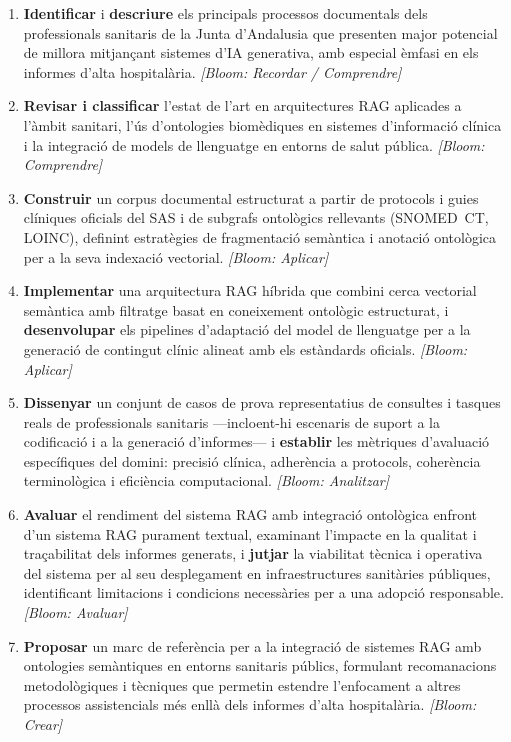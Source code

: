 \documentclass[11pt,a4paper]{article}
\begin{document}
\begin{enumerate}

    \item \textbf{Identificar} i \textbf{descriure} els principals processos documentals dels professionals sanitaris de la Junta d'Andalusia que presenten major potencial de millora mitjançant sistemes d'IA generativa, amb especial èmfasi en els informes d'alta hospitalària.
    \textit{[Bloom: Recordar / Comprendre]}

    \item \textbf{Revisar i classificar} l'estat de l'art en arquitectures RAG aplicades a l'àmbit sanitari, l'ús d'ontologies biomèdiques en sistemes d'informació clínica i la integració de models de llenguatge en entorns de salut pública.
    \textit{[Bloom: Comprendre]}

    \item \textbf{Construir} un corpus documental estructurat a partir de protocols i guies clíniques oficials del SAS i de subgrafs ontològics rellevants (SNOMED~CT, LOINC), definint estratègies de fragmentació semàntica i anotació ontològica per a la seva indexació vectorial.
    \textit{[Bloom: Aplicar]}

    \item \textbf{Implementar} una arquitectura RAG híbrida que combini cerca vectorial semàntica amb filtratge basat en coneixement ontològic estructurat, i \textbf{desenvolupar} els pipelines d'adaptació del model de llenguatge per a la generació de contingut clínic alineat amb els estàndards oficials.
    \textit{[Bloom: Aplicar]}
    
    \item \textbf{Dissenyar} un conjunt de casos de prova representatius de consultes i tasques reals de professionals sanitaris ---incloent-hi escenaris de suport a la codificació i a la generació d'informes--- i \textbf{establir} les mètriques d'avaluació específiques del domini: precisió clínica, adherència a protocols, coherència terminològica i eficiència computacional.
    \textit{[Bloom: Analitzar]}

    \item \textbf{Avaluar} el rendiment del sistema RAG amb integració ontològica enfront d'un sistema RAG purament textual, examinant l'impacte en la qualitat i traçabilitat dels informes generats, i \textbf{jutjar} la viabilitat tècnica i operativa del sistema per al seu desplegament en infraestructures sanitàries públiques, identificant limitacions i condicions necessàries per a una adopció responsable.
    \textit{[Bloom: Avaluar]}

    \item \textbf{Proposar} un marc de referència per a la integració de sistemes RAG amb ontologies semàntiques en entorns sanitaris públics, formulant recomanacions metodològiques i tècniques que permetin estendre l'enfocament a altres processos assistencials més enllà dels informes d'alta hospitalària.
    \textit{[Bloom: Crear]}
\end{enumerate}
\end{document}
